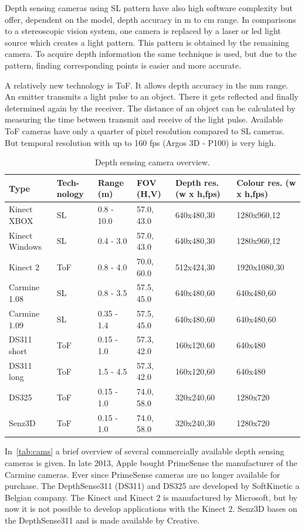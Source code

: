 Depth sensing cameras using \ac{SL} pattern have also high software complexity but offer, dependent on the model, depth accuracy in \textmu m to cm range. In comparisons to a stereoscopic vision system, one camera is replaced by a laser or led light source which creates a light pattern. This pattern is obtained by the remaining camera. To acquire depth information the same technique is used, but due to the pattern, finding corresponding points is easier and more accurate.

A relatively new technology is \ac{ToF}. It allows depth accuracy in the mm range. An emitter transmits a light pulse to an object. There it gets reflected and finally determined again by the receiver. The distance of an object can be calculated by measuring the time between transmit and receive of the light pulse. Available \ac{ToF} cameras have only a quarter of pixel resolution compared to \ac{SL} cameras. But temporal resolution with up to 160 \ac{fps} (Argos 3D - P100) is very high.

\begin{table}[htb]
\begin{tabularx}{\textwidth}{ l X l l p{1.9cm} p{1.9cm}}
\toprule
Type & Tech-nology & Range (m) & FOV (H,V) & Depth res. (w x h,fps) & Colour res. (w x h,fps) \\
\midrule
Kinect XBOX & SL & 0.8 - 10.0 & 57.0, 43.0 & 640x480,30 & 1280x960,12 \\
Kinect Windows & SL & 0.4 - 3.0 & 57.0, 43.0 & 640x480,30 & 1280x960,12 \\
Kinect 2 & ToF & 0.8 - 4.0 & 70.0, 60.0 & 512x424,30 & 1920x1080,30 \\
Carmine 1.08 & SL & 0.8 - 3.5 & 57.5, 45.0 & 640x480,60 & 640x480,60 \\
Carmine 1.09 & SL & 0.35 - 1.4 & 57.5, 45.0 & 640x480,60 & 640x480,60 \\
DS311 short & ToF & 0.15 - 1.0 & 57.3, 42.0 & 160x120,60 & 640x480 \\
DS311 long & ToF & 1.5 - 4.5 & 57.3, 42.0 & 160x120,60 & 640x480 \\
DS325 & ToF & 0.15 - 1.0 & 74.0, 58.0 & 320x240,60 & 1280x720 \\
Senz3D & ToF & 0.15 - 1.0 & 74.0, 58.0 & 320x240,30 & 1280x720 \\
\bottomrule
\end{tabularx}
\caption{Depth sensing camera overview.}
\label{tab:cams}
\end{table}
In~\autoref{tab:cams} a brief overview of several commercially available depth sensing cameras is given. 
In late 2013, Apple bought PrimeSense the manufacturer of the Carmine cameras. Ever since PrimeSense cameras are no longer available for purchase.
The DepthSense311 (DS311) and DS325 are developed by SoftKinetic a Belgian company. The Kinect and Kinect 2 is manufactured by Microsoft, but by now it is not possible to develop applications with the Kinect 2. Senz3D bases on the DepthSense311 and is made available by Creative.
	


